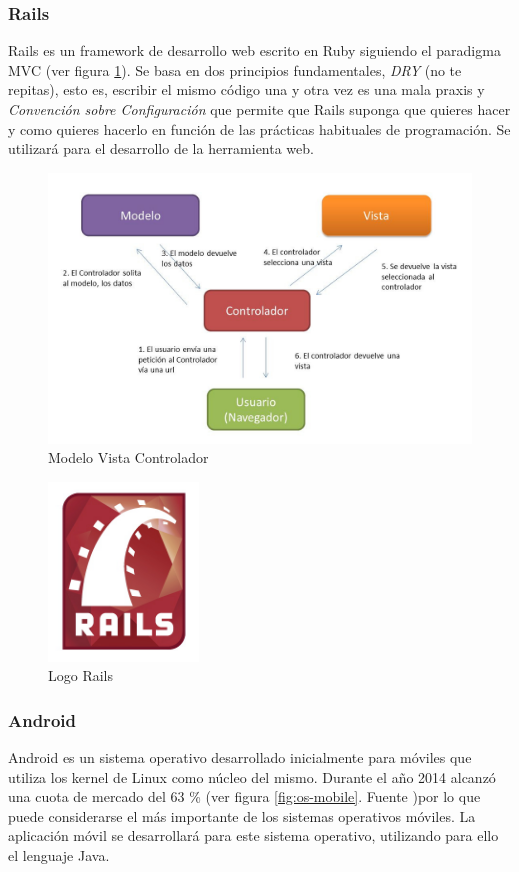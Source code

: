 		\subsubsection{Rails}
		Rails es un framework de desarrollo web escrito en Ruby siguiendo el paradigma \ac{MVC} (ver figura \ref{fig:mvc}). Se basa en dos principios fundamentales, \textit{\ac{DRY}} (no te repitas), esto es, escribir el mismo código una y otra vez es una mala praxis y \textit{Convención sobre Configuración} que permite que Rails suponga que quieres hacer y como quieres hacerlo en función de las prácticas habituales de programación. Se utilizará para el desarrollo de la herramienta web.
		
		\begin{figure}[h!btp]
		\centering
		\includegraphics[width=120mm, fbox={\fboxrule} 4mm]{images/04-metodo/07-mvc.jpg}
		\caption{Modelo Vista Controlador}
		\label{fig:mvc}
		\end{figure}
		
		\begin{figure}[H]
		\centering
		\includegraphics[width=40mm, fbox={\fboxrule} 4mm]{images/04-metodo/08-rails_logo.png}
		\caption{Logo Rails}
		\label{fig:rails-logo}
		\end{figure}
		
		\subsubsection{Android}
		Android es un sistema operativo desarrollado inicialmente para móviles que utiliza los kernel de Linux como núcleo del mismo. Durante el año 2014 alcanzó una cuota de mercado del 63 \% (ver figura \ref{fig:os-mobile}. Fuente \cite{Are15})por lo que puede considerarse el más importante de los sistemas operativos móviles. 
		La aplicación móvil se desarrollará para este sistema operativo, utilizando para ello el lenguaje Java.
		
